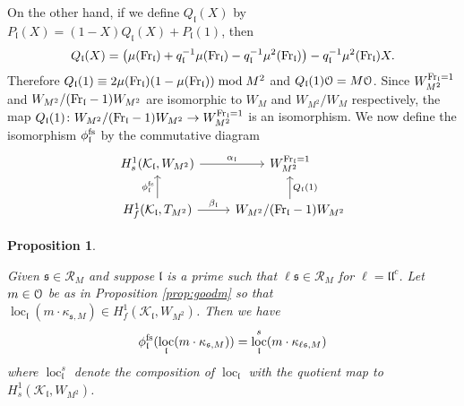 \documentclass[leqno]{amsart}
\newtheorem{prop}[thm]{Proposition}
\theoremstyle{definition}
\theoremstyle{remark}
\newcommand{\eo}{\EuScript{O}}
\newcommand{\Fr}{\textnormal{Fr}} %
\newcommand{\fl}{\mathfrak{l}}
\newcommand{\fs}{\mathfrak{s}}
\newcommand{\K}{{\mathcal{K}}} %
\DeclareMathOperator{\loc}{loc}
\begin{document}
On the other hand,
if we define $Q_\fl(X)$ by
$P_\fl(X)=(1-X)Q_\fl(X)+P_\fl(1)$, then
\[
Q_\fl(X)=\big(\mu(\Fr_\fl)+q_\fl^{-1}\mu(\Fr_\fl)-q_\fl^{-1}\mu^2(\Fr_\fl)\big)-
q_\fl^{-1}\mu^2(\Fr_\fl)X.
\]
Therefore $Q_\fl(1)\equiv 2\mu(\Fr_\fl)(1-\mu(\Fr_\fl))\bmod M^2$
and $Q_\fl(1)\eo=M\eo$.
Since $W_{M^2}^{\Fr_\fl=1}$ and $W_{M^2}/(\Fr_\fl-1)W_{M^2}$ 
are isomorphic to $W_M$ and $W_{M^2}/W_M$
respectively, the map
$Q_\fl(1)\colon W_{M^2}/(\Fr_\fl-1)W_{M^2}\to W_{M^2}^{\Fr_\fl=1}$
is an isomorphism. 
We now define the isomorphism
$\phi_\fl^{\textnormal{fs}}$ by the commutative diagram
\begin{equation}\label{def:finite_singular}
	\begin{tikzcd}
		H^1_s(\K_\fl, W_{M^2}) \arrow[r,"\alpha_\fl"]&
		W_{M^2}^{\Fr_\fl=1} \\
		H^1_{f}(\K_\fl, T_{M^2}) \arrow[r,"\beta_\fl"]
		\arrow[u,"\phi_\fl^{\textnormal{fs}}"]&
		W_{M^2}/(\Fr_\fl-1)W_{M^2}
		\arrow[u,"Q_\fl(1)",swap]
	\end{tikzcd}
\end{equation}


\begin{prop}\label{prop:fscomparison}

Given $\fs\in\mathcal{R}_M$
and suppose $\fl$ is a prime such that 
$\ell\fs\in\mathcal{R}_M$ for $\ell=\fl\fl^c$.
Let $m\in \eo$ be as in Proposition \ref{prop:goodm}
so that $\loc_\fl(m\cdot \kappa_{\fs,M})\in H^1_f(\K_\fl, W_{M^2})$.
Then we have  
\[
\phi_\fl^{\textnormal{fs}}(\loc_{\fl}(m\cdot \kappa_{\fs,M}))=
\loc^s_\fl(m\cdot \kappa_{\ell\fs,M})
\]
where $\loc_\fl^s$ denote the composition of $\loc_\fl$
with the quotient map to $H^1_s(\K_\fl,W_{M^2})$.

\end{prop}
\end{document}
